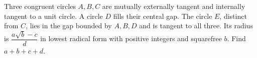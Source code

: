 Three congruent circles $A,B,C$ are mutually externally tangent and internally tangent to a unit circle. A circle $D$ fills their central gap. The circle $E$, distinct from $C$, lies in the gap bounded by $A,B,D$ and is tangent to all three. Its radius is $\dfrac{a\sqrt b-c}{d}$ in lowest radical form with positive integers and squarefree $b$. Find $a+b+c+d$.
